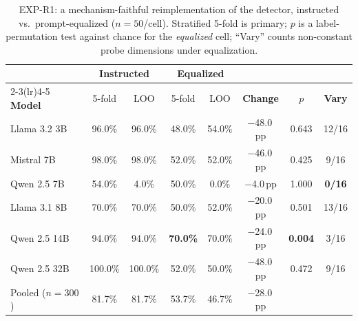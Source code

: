 \begin{table}[h]
\centering
\small
\setlength{\tabcolsep}{4pt}
\caption{EXP-R1: a mechanism-faithful reimplementation of the \citet{pacchiardi2024catch} detector, instructed vs.\ prompt-equalized ($n{=}50$/cell). Stratified 5-fold is primary; $p$ is a label-permutation test against chance for the \emph{equalized} cell; ``Vary'' counts non-constant probe dimensions under equalization.}
\label{tab:r1_faithful}
\begin{tabular}{lccccccc}
\toprule
& \multicolumn{2}{c}{\textbf{Instructed}} & \multicolumn{2}{c}{\textbf{Equalized}} & & & \\
\cmidrule(lr){2-3}\cmidrule(lr){4-5}
\textbf{Model} & 5-fold & LOO & 5-fold & LOO & \textbf{Change} & \textbf{$p$} & \textbf{Vary} \\
\midrule
Llama 3.2 3B    & 96.0\%  & 96.0\%  & 48.0\% & 54.0\% & $-$48.0\,pp & 0.643 & 12/16 \\
Mistral 7B      & 98.0\%  & 98.0\%  & 52.0\% & 52.0\% & $-$46.0\,pp & 0.425 & 9/16 \\
Qwen 2.5 7B     & 54.0\%  & \phantom{0}4.0\% & 50.0\% & \phantom{0}0.0\% & $-$4.0\,pp & 1.000 & \textbf{0/16} \\
Llama 3.1 8B    & 70.0\%  & 70.0\%  & 50.0\% & 52.0\% & $-$20.0\,pp & 0.501 & 13/16 \\
Qwen 2.5 14B    & 94.0\%  & 94.0\%  & \textbf{70.0\%} & 70.0\% & $-$24.0\,pp & \textbf{0.004} & 3/16 \\
Qwen 2.5 32B    & 100.0\% & 100.0\% & 52.0\% & 50.0\% & $-$48.0\,pp & 0.472 & 9/16 \\
\midrule
Pooled ($n{=}300$) & 81.7\% & 81.7\% & 53.7\% & 46.7\% & $-$28.0\,pp & & \\
\bottomrule
\end{tabular}
\end{table}

